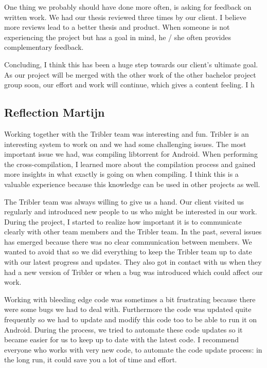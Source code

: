 			
			One thing we probably should have done more often, is asking for feedback on written work. We had our thesis reviewed three times by our client. I believe more reviews lead to a better thesis and product. When someone is not experiencing the project but has a goal in mind, he / she often provides complementary feedback.
			
			Concluding, I think this has been a huge step towards our client's ultimate goal. As our project will be merged with the other work of the other bachelor project group soon, our effort and work will continue, which gives a content feeling. I h
		
		\subsection{Reflection Martijn}
		Working together with the Tribler team was interesting and fun. Tribler is an interesting system to work on and we had some challenging issues. The most important issue we had, was compiling libtorrent for Android. When performing the cross-compilation, I learned more about the compilation process and gained more insights in what exactly is going on when compiling. I think this is a valuable experience because this knowledge can be used in other projects as well.
		
		The Tribler team was always willing to give us a hand. Our client visited us regularly and introduced new people to us who might be interested in our work. During the project, I started to realize how important it is to communicate clearly with other team members and the Tribler team. In the past, several issues has emerged because there was no clear communication between members. We wanted to avoid that so we did everything to keep the Tribler team up to date with our latest progress and updates. They also got in contact with us when they had a new version of Tribler or when a bug was introduced which could affect our work.
		
		Working with bleeding edge code was sometimes a bit frustrating because there were some bugs we had to deal with. Furthermore the code was updated quite frequently so we had to update and modify this code too to be able to run it on Android. During the process, we tried to automate these code updates so it became easier for us to keep up to date with the latest code. I recommend everyone who works with very new code, to automate the code update process: in the long run, it could save you a lot of time and effort.
		
